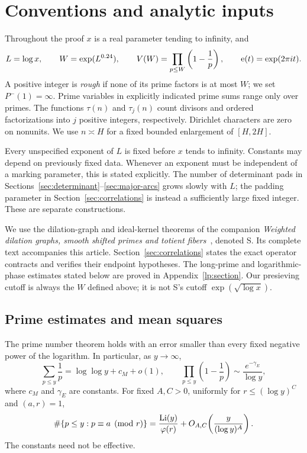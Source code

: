 \section{Conventions and analytic inputs}\label{sec:inputs}

Throughout the proof $x$ is a real parameter tending to infinity, and
\[
 L=\log x,\qquad W=\exp(L^{0.24}),\qquad
 V(W)=\prod_{p\le W}\left(1-\frac1p\right),\qquad
 \mathrm{e}(t)=\exp(2\pi i t).
\]
A positive integer is \emph{rough} if none of its prime factors is at
most $W$; we set $P^-(1)=\infty$.  Prime variables in explicitly
indicated prime sums range only over primes.  The functions $\tau(n)$
and $\tau_j(n)$ count divisors and ordered factorizations into $j$
positive integers, respectively.  Dirichlet characters are zero on
nonunits.  We use $n\asymp H$ for a fixed bounded enlargement of
$[H,2H]$.

Every unspecified exponent of $L$ is fixed before $x$ tends to
infinity.  Constants may depend on previously fixed data.  Whenever
an exponent must be independent of a marking parameter, this is
stated explicitly.  The number of determinant pads in
Sections~\ref{sec:determinant}--\ref{sec:major-arcs} grows slowly
with $L$; the padding parameter in Section~\ref{sec:correlations}
is instead a sufficiently large fixed integer.  These are separate
constructions.

We use the dilation-graph and ideal-kernel theorems of the companion
\emph{Weighted dilation graphs, smooth shifted primes and totient
fibers}~\cite{SmoothShifted}, denoted S. Its complete text accompanies
this article. Section~\ref{sec:correlations} states the exact operator
contracts and verifies their endpoint hypotheses. The long-prime and
logarithmic-phase estimates stated below are proved in
Appendix~\ref{lp:section}. Our presieving cutoff is always the $W$
defined above; it is not S's cutoff $\exp(\sqrt{\log x})$.

\subsection{Prime estimates and mean squares}

\begin{lemma}\label{lem:prime-estimates}
The prime number theorem holds with an error smaller than every
fixed negative power of the logarithm.  In particular, as $y\to\infty$,
\[
 \sum_{p\le y}\frac1p=\log\log y+c_M+o(1),
 \qquad
 \prod_{p\le y}\left(1-\frac1p\right)
       \sim\frac{e^{-\gamma_E}}{\log y},
\]
where $c_M$ and $\gamma_E$ are constants.  For fixed $A,C>0$,
uniformly for $r\le(\log y)^C$ and $(a,r)=1$,
\[
 \#\{p\le y:p\equiv a\pmod r\}
 =\frac{\operatorname{Li}(y)}{\varphi(r)}
     +O_{A,C}\!\left(\frac{y}{(\log y)^A}\right).
\]
The constants need not be effective.
\end{lemma}

